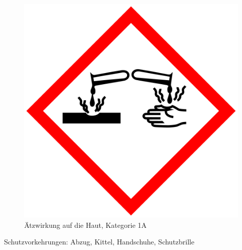 \begin{figure}[h]
\begin{center}
\begin{minipage}[t]{0.4\textwidth}
\begin{center}
                \includegraphics[height=0.1\textheight]{Bilder/Optische_Datentraeger_Die_Compact_Disc/Material_Polycarbonat/cdaetzwirkung.png}
                \caption[Ätzwirkung auf die Haut, Kategorie 1A \newline \url{https://upload.wikimedia.org/wikipedia/commons/a/a1/GHS-pictogram-acid.svg}]{Ätzwirkung auf die Haut, Kategorie 1A}
                \label{fig:cdaetzwirkung}
            \end{center}
        \end{minipage}
    \end{center}
\end{figure}

Schutzvorkehrungen: Abzug, Kittel, Handschuhe, Schutzbrille
\begin{itemize}
\end{itemize}

